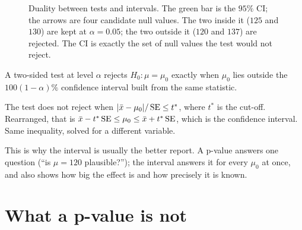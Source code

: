 \begin{figure}[H]
\centering
{}
\caption{Duality between tests and intervals. The green bar is the $95\%$ CI; the
arrows are four candidate null values. The two inside it ($125$ and $130$) are kept
at $\alpha=0.05$; the two outside it ($120$ and $137$) are rejected. The CI is exactly
the set of null values the test would not reject.}
\label{fig:ht-duality}
\end{figure}

\begin{theorem}[Duality]
A two-sided test at level $\alpha$ rejects $H_0\colon\mu=\mu_0$ exactly when $\mu_0$ lies
outside the $100(1-\alpha)\%$ confidence interval built from the same statistic.
\end{theorem}

\begin{whybox}
The test does not reject when $|\bar{x}-\mu_0|/\operatorname{SE} \le t^*$, where $t^*$ is the
cut-off. Rearranged, that is $\bar{x} - t^*\operatorname{SE} \le \mu_0 \le \bar{x} + t^*\operatorname{SE}$, which is
the confidence interval. Same inequality, solved for a different variable.
\end{whybox}

This is why the interval is usually the better report. A p-value answers one
question (``is $\mu=120$ plausible?''); the interval answers it for every $\mu_0$ at
once, and also shows how big the effect is and how precisely it is known.

\section{What a p-value is not}
\label{sec:ht-not}

